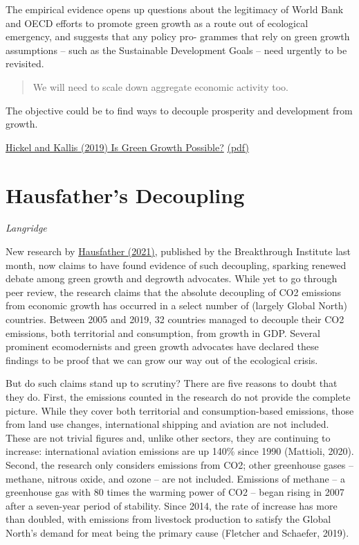 \documentclass[
]{book}
\begin{document}
The empirical evidence opens up questions about the legitimacy of World Bank and OECD efforts
to promote green growth as a route out of ecological emergency, and suggests that any policy pro-
grammes that rely on green growth assumptions -- such as the Sustainable Development Goals --
need urgently to be revisited.

\begin{quote}
We will need to scale down aggregate economic activity too.
\end{quote}

The objective could be to find ways to decouple prosperity and development from growth.

\href{https://doi.org/10.1080/13563467.2019.1598964}{Hickel and Kallis (2019) Is Green Growth Possible?}
\href{pdf/Hickel_and_Kallis_2019_Is_Green_Growth_Possible.pdf}{(pdf)}

\hypertarget{hausfathers-decoupling}{%
\section{Hausfather's Decoupling}\label{hausfathers-decoupling}}

\emph{Langridge}

New research by \href{https://thebreakthrough.org/issues/energy/absolute-decoupling-of-economic-growth-and-emissions-in-32-countries}{Hausfather (2021)}, published by the Breakthrough Institute last month, now claims to have found evidence of such decoupling, sparking renewed debate among green growth and degrowth advocates. While yet to go through peer review, the research claims that the absolute decoupling of CO2 emissions from economic growth has occurred in a select number of (largely Global North) countries. Between 2005 and 2019, 32 countries managed to decouple their CO2 emissions, both territorial and consumption, from growth in GDP. Several prominent ecomodernists and green growth advocates have declared these findings to be proof that we can grow our way out of the ecological crisis.

But do such claims stand up to scrutiny? There are five reasons to doubt that they do. First, the emissions counted in the research do not provide the complete picture. While they cover both territorial and consumption-based emissions, those from land use changes, international shipping and aviation are not included. These are not trivial figures and, unlike other sectors, they are continuing to increase: international aviation emissions are up 140\% since 1990 (Mattioli, 2020). Second, the research only considers emissions from CO2; other greenhouse gases -- methane, nitrous oxide, and ozone -- are not included. Emissions of methane -- a greenhouse gas with 80 times the warming power of CO2 -- began rising in 2007 after a seven-year period of stability. Since 2014, the rate of increase has more than doubled, with emissions from livestock production to satisfy the Global North's demand for meat being the primary cause (Fletcher and Schaefer, 2019).
\end{document}
